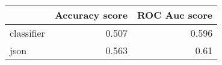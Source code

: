 \begin{tabular}{lrr}
\toprule
            &   Accuracy score &   ROC Auc score \\
\midrule
 classifier &            0.507 &           0.596 \\
 json       &            0.563 &           0.61  \\
\bottomrule
\end{tabular}